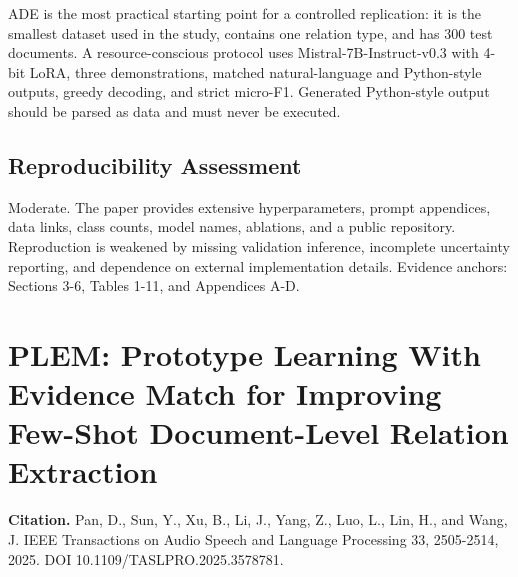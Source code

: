 \documentclass[11pt]{article}
\begin{document}
ADE is the most practical starting point for a controlled replication:
it is the smallest dataset used in the study, contains one relation
type, and has 300 test documents. A resource-conscious protocol uses
Mistral-7B-Instruct-v0.3 with 4-bit LoRA, three demonstrations, matched
natural-language and Python-style outputs, greedy decoding, and strict
micro-F1. Generated Python-style output should be parsed as data and
must never be executed.

\subsection{Reproducibility
Assessment}\label{reproducibility-assessment-3}

Moderate. The paper provides extensive hyperparameters, prompt
appendices, data links, class counts, model names, ablations, and a
public repository. Reproduction is weakened by missing validation
inference, incomplete uncertainty reporting, and dependence on external
implementation details. Evidence anchors: Sections 3-6, Tables 1-11,
and Appendices A-D.

\clearpage
\section{PLEM: Prototype Learning With Evidence Match for Improving
Few-Shot Document-Level Relation
Extraction}\label{plem-prototype-learning-with-evidence-match-for-improving-few-shot-document-level-relation-extraction}

\textbf{Citation.} Pan, D., Sun, Y., Xu, B., Li, J., Yang, Z., Luo, L.,
Lin, H., and Wang, J. IEEE Transactions on Audio Speech and Language
Processing 33, 2505-2514, 2025. DOI 10.1109/TASLPRO.2025.3578781.
\end{document}

